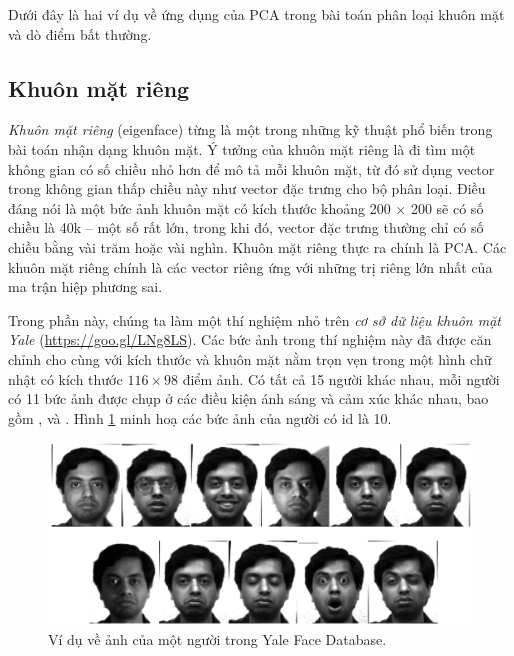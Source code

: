 Dưới đây là hai ví dụ về ứng dụng của PCA trong bài toán phân loại khuôn mặt và dò điểm bất thường.

\subsection{Khuôn mặt riêng}
\textit{Khuôn mặt riêng} (eigenface) từng là một trong những kỹ thuật phổ biến
trong bài toán nhận dạng khuôn mặt. Ý tưởng của khuôn mặt riêng là đi tìm một
không gian có số chiều nhỏ hơn để mô tả mỗi khuôn mặt, từ đó sử dụng vector
trong không gian thấp chiều này như vector đặc trưng cho bộ phân loại. Điều đáng
nói là một bức ảnh khuôn mặt có kích thước khoảng 200 $\times$ 200 sẽ có số
chiều là 40k -- một số rất lớn, trong khi đó, vector đặc trưng thường chỉ có số
chiều bằng vài trăm hoặc vài nghìn. Khuôn mặt riêng thực ra chính là PCA. Các
khuôn mặt riêng chính là các vector riêng ứng với những trị riêng lớn nhất của
ma trận hiệp phương sai.

Trong phần này, chúng ta làm một thí nghiệm nhỏ trên \textit{cơ sở dữ liệu
    khuôn mặt Yale} (\url{https://goo.gl/LNg8LS}). Các bức ảnh trong thí nghiệm
này đã được căn chỉnh cho cùng với kích thước và khuôn mặt nằm trọn vẹn trong
một hình chữ nhật có kích thước $116 \times  98$ điểm ảnh. Có tất cả 15 người khác
nhau, mỗi người có 11 bức ảnh được chụp ở các điều kiện ánh sáng và cảm xúc khác
nhau, bao gồm , và
. Hình \ref{fig:28_1} minh hoạ các bức ảnh của
người có id là 10.


\begin{figure}[t]
    \centering
    \includegraphics[width = \textwidth]{Chapters/07_DimemsionalityReduction/28_pca2/latex/yaleb_exs.pdf}
    \caption[]{Ví dụ về ảnh của một người trong Yale Face Database.}
    \label{fig:28_1}
\end{figure}

